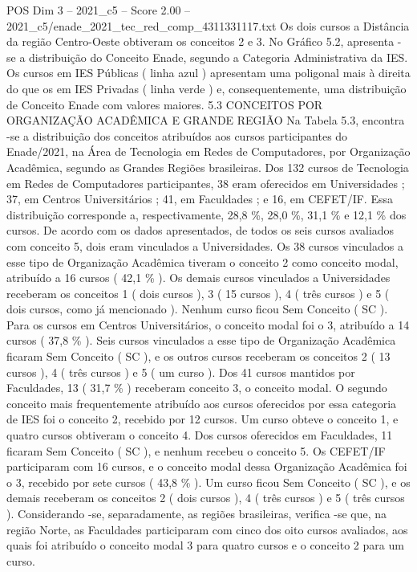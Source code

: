 \begin{textsample}{POS Dim 3 – 2021\_c5 – Score 2.00 – 2021\_c5/enade\_2021\_tec\_red\_comp\_4311331117.txt}
Os dois cursos a Distância da região Centro-Oeste obtiveram os conceitos 2 e 3.
No Gráfico 5.2, apresenta -se a distribuição do Conceito Enade, segundo a Categoria Administrativa da IES.
Os cursos em IES Públicas ( linha azul ) apresentam uma poligonal mais à direita do que os em IES Privadas ( linha verde ) e, consequentemente, uma distribuição de Conceito Enade com valores maiores. 5.3 CONCEITOS POR ORGANIZAÇÃO ACADÊMICA E GRANDE REGIÃO Na Tabela 5.3, encontra -se a distribuição dos conceitos atribuídos aos cursos participantes do Enade/2021, na Área de Tecnologia em Redes de Computadores, por Organização Acadêmica, segundo as Grandes Regiões brasileiras.
Dos 132 cursos de Tecnologia em Redes de Computadores participantes, 38 eram oferecidos em Universidades ; 37, em Centros Universitários ; 41, em Faculdades ; e 16, em CEFET/IF.
Essa distribuição corresponde a, respectivamente, 28,8 \%, 28,0 \%, 31,1 \% e 12,1 \% dos cursos.
De acordo com os dados apresentados, de todos os seis cursos avaliados com conceito 5, dois eram vinculados a Universidades.
Os 38 cursos vinculados a esse tipo de Organização Acadêmica tiveram o conceito 2 como conceito modal, atribuído a 16 cursos ( 42,1 \% ).
Os demais cursos vinculados a Universidades receberam os conceitos 1 ( dois cursos ), 3 ( 15 cursos ), 4 ( três cursos ) e 5 ( dois cursos, como já mencionado ).
Nenhum curso ficou Sem Conceito ( SC ).
Para os cursos em Centros Universitários, o conceito modal foi o 3, atribuído a 14 cursos ( 37,8 \% ).
Seis cursos vinculados a esse tipo de Organização Acadêmica ficaram Sem Conceito ( SC ), e os outros cursos receberam os conceitos 2 ( 13 cursos ), 4 ( três cursos ) e 5 ( um curso ).
Dos 41 cursos mantidos por Faculdades, 13 ( 31,7 \% ) receberam conceito 3, o conceito modal.
O segundo conceito mais frequentemente atribuído aos cursos oferecidos por essa categoria de IES foi o conceito 2, recebido por 12 cursos.
Um curso obteve o conceito 1, e quatro cursos obtiveram o conceito 4.
Dos cursos oferecidos em Faculdades, 11 ficaram Sem Conceito ( SC ), e nenhum recebeu o conceito 5.
Os CEFET/IF participaram com 16 cursos, e o conceito modal dessa Organização Acadêmica foi o 3, recebido por sete cursos ( 43,8 \% ).
Um curso ficou Sem Conceito ( SC ), e os demais receberam os conceitos 2 ( dois cursos ), 4 ( três cursos ) e 5 ( três cursos ).
Considerando -se, separadamente, as regiões brasileiras, verifica -se que, na região Norte, as Faculdades participaram com cinco dos oito cursos avaliados, aos quais foi atribuído o conceito modal 3 para quatro cursos e o conceito 2 para um curso.

\end{textsample}
